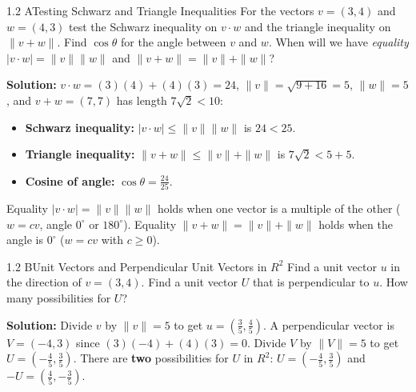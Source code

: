 \documentclass[11pt,a4paper,openany,oneside]{book}
\def\vect#1{#1}%
\def\mathbf#1{#1}%
\newcommand{\vect}[1]{\mathbf{#1}}
\numberwithin{equation}{chapter}
\begin{document}
\begin{example}{1.2 A}{Testing Schwarz and Triangle Inequalities}
For the vectors $\vect{v} = (3, 4)$ and $\vect{w} = (4, 3)$ test the Schwarz inequality on $\vect{v}\cdot\vect{w}$ and the triangle inequality on $\|\vect{v} + \vect{w}\|$. Find $\cos\theta$ for the angle between $\vect{v}$ and $\vect{w}$. When will we have \emph{equality} $|\vect{v}\cdot\vect{w}| = \|\vect{v}\|\|\vect{w}\|$ and $\|\vect{v} + \vect{w}\| = \|\vect{v}\| + \|\vect{w}\|$?
\end{example}
\textbf{Solution:} $\vect{v}\cdot\vect{w} = (3)(4) + (4)(3) = 24$, $\|\vect{v}\| = \sqrt{9+16} = 5$, $\|\vect{w}\| = 5$, and $\vect{v}+\vect{w} = (7,7)$ has length $7\sqrt{2} < 10$:
\begin{itemize}
\item \textbf{Schwarz inequality:} $|\vect{v}\cdot\vect{w}| \le \|\vect{v}\|\|\vect{w}\|$ is $24 < 25$.
\item \textbf{Triangle inequality:} $\|\vect{v}+\vect{w}\| \le \|\vect{v}\| + \|\vect{w}\|$ is $7\sqrt{2} < 5 + 5$.
\item \textbf{Cosine of angle:} $\cos\theta = \frac{24}{25}$.
\end{itemize}
Equality $|\vect{v}\cdot\vect{w}| = \|\vect{v}\|\|\vect{w}\|$ holds when one vector is a multiple of the other ($\vect{w} = c\vect{v}$, angle $0^\circ$ or $180^\circ$). Equality $\|\vect{v}+\vect{w}\| = \|\vect{v}\| + \|\vect{w}\|$ holds when the angle is $0^\circ$ ($\vect{w} = c\vect{v}$ with $c \ge 0$).

\begin{example}{1.2 B}{Unit Vectors and Perpendicular Unit Vectors in $\mathbf{R}^2$}
Find a unit vector $\vect{u}$ in the direction of $\vect{v} = (3, 4)$. Find a unit vector $\vect{U}$ that is perpendicular to $\vect{u}$. How many possibilities for $\vect{U}$?
\end{example}
\textbf{Solution:} Divide $\vect{v}$ by $\|\vect{v}\| = 5$ to get $\vect{u} = \left(\frac{3}{5}, \frac{4}{5}\right)$. A perpendicular vector is $\vect{V} = (-4,3)$ since $(3)(-4)+(4)(3)=0$. Divide $\vect{V}$ by $\|\vect{V}\|=5$ to get $\vect{U} = \left(-\frac{4}{5}, \frac{3}{5}\right)$. There are \textbf{two} possibilities for $\vect{U}$ in $\mathbf{R}^2$: $\vect{U} = \left(-\frac{4}{5}, \frac{3}{5}\right)$ and $-\vect{U} = \left(\frac{4}{5}, -\frac{3}{5}\right)$.
\end{document}
